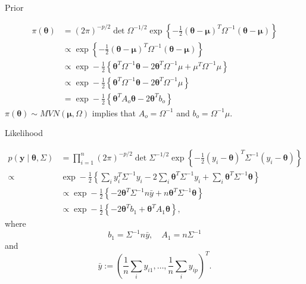 \documentclass[
  ignorenonframetext,
]{beamer}
\newcommand{\btheta}{{\bm\theta}}
\newcommand{\bmu}{\bm{\mu}}
\begin{document}
\begin{frame}{Prior}
\protect\hypertarget{prior}{}

\begin{align}
\pi(\btheta) &= {\left(2\pi\right)}^{-p/2}\det{\Omega}^{-1/2} \exp{\left\{-\frac{1}{2} (\btheta-\bmu)^T\Omega^{-1} (\btheta - \bmu)\right\}} \\
& \propto \exp{\left\{-\frac{1}{2} (\btheta-\bmu)^T\Omega^{-1} (\btheta - \bmu)\right\}} \\
& \propto \exp-\frac{1}{2} {\left \{\btheta^T\Omega^{-1} \btheta - 2 \btheta^T \Omega^{-1} \mu + \mu^T \Omega^{-1} \mu \right \}} \\
& \propto \exp-\frac{1}{2} {\left \{\btheta^T\Omega^{-1} \btheta - 2 \btheta^T \Omega^{-1} \mu  \right \}}\\
&= \exp-\frac{1}{2} {\left \{\btheta^TA_o \btheta - 2 \btheta^T  b_o  \right \}}
\end{align} \(\pi(\btheta) \sim MVN(\bmu, \Omega)\) implies that
\(A_o = \Omega^{-1}\) and \(b_o = \Omega^{-1} \mu.\)

\end{frame}

\begin{frame}{Likelihood}
\protect\hypertarget{likelihood}{}

\begin{align}
p(\bm{y} \mid \btheta, \Sigma) &= \prod_{i=1}^n
{\left(2\pi\right)}^{-p/2}\det{\Sigma}^{-1/2} \exp{\left\{-\frac{1}{2} (y_i-\btheta)^T\Sigma^{-1} (y_i - \btheta)\right\}}\\
\propto 
& \exp-\frac{1}{2} {\left \{ \sum_i y_i^T \Sigma^{-1} y_i -2 \sum_i \btheta^T \Sigma^{-1} y_i + 
\sum_i \btheta^T\Sigma^{-1} \btheta 
 \right \}}\\
 & \propto \exp-\frac{1}{2} {\left \{  -2 \btheta^T \Sigma^{-1} n\bar{y} + 
n \btheta^T\Sigma^{-1} \btheta 
 \right \}}\\
  & \propto \exp-\frac{1}{2} {\left \{  -2 \btheta^T b_1+ 
\btheta^T A_1 \btheta \right \}},
\end{align} where
\[b_1= \Sigma^{-1} n\bar{y}, \quad A_1 = n\Sigma^{-1}\] and
\[\bar{y} := (\frac{1}{n}\sum_i y_{i1} ,\ldots, \frac{1}{n} \sum_i y_{ip})^T.\]

\end{frame}
\end{document}
